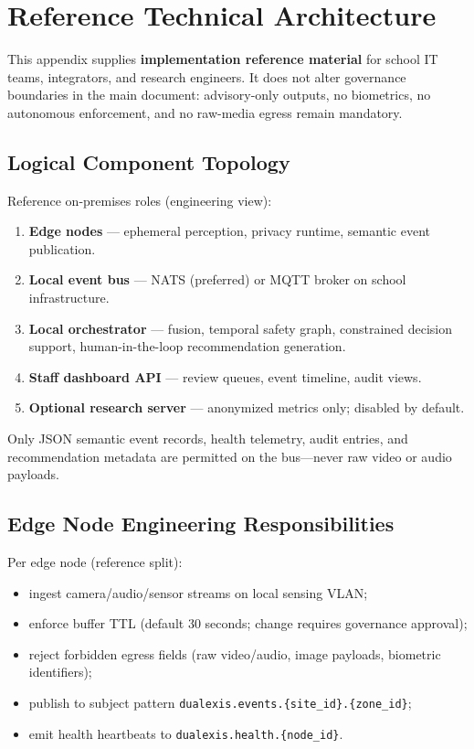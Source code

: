 \section{Reference Technical Architecture}
\label{app:technical-architecture}

This appendix supplies \textbf{implementation reference material} for school IT teams,
integrators, and research engineers.
It does not alter governance boundaries in the main document: advisory-only outputs,
no biometrics, no autonomous enforcement, and no raw-media egress remain mandatory.

\subsection{Logical Component Topology}

Reference on-premises roles (engineering view):

\begin{enumerate}[noitemsep]
  \item \textbf{Edge nodes} --- ephemeral perception, privacy runtime, semantic event publication.
  \item \textbf{Local event bus} --- NATS (preferred) or MQTT broker on school infrastructure.
  \item \textbf{Local orchestrator} --- fusion, temporal safety graph, constrained decision
        support, human-in-the-loop recommendation generation.
  \item \textbf{Staff dashboard API} --- review queues, event timeline, audit views.
  \item \textbf{Optional research server} --- anonymized metrics only; disabled by default.
\end{enumerate}

Only JSON semantic event records, health telemetry, audit entries, and recommendation
metadata are permitted on the bus---never raw video or audio payloads.

\subsection{Edge Node Engineering Responsibilities}

Per edge node (reference split):
\begin{itemize}[noitemsep]
  \item ingest camera/audio/sensor streams on local sensing VLAN;
  \item enforce buffer TTL (default 30 seconds; change requires governance approval);
  \item reject forbidden egress fields (raw video/audio, image payloads, biometric identifiers);
  \item publish to subject pattern \texttt{dualexis.events.\{site\_id\}.\{zone\_id\}};
  \item emit health heartbeats to \texttt{dualexis.health.\{node\_id\}}.
\end{itemize}

